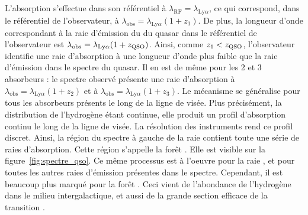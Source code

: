 L'absorption \lya{} s'effectue dans son référentiel à $\lambda_{\mathrm{RF}} = \lambda_{\mathrm{Ly}\alpha}$, ce qui correspond, dans le référentiel de l'observateur, à $\lambda_{\mathrm{obs}} = \lambda_{\mathrm{Ly}\alpha} (1+z_{1})$. De plus, la longueur d'onde correspondant à la raie d'émission du \lya{} du quasar dans le référentiel de l'observateur est $\lambda_{\mathrm{obs}} = \lambda_{\mathrm{Ly}\alpha} (1+z_{\textsc{QSO}})$. Ainsi, comme $z_1 < z_{\textsc{QSO}}$, l'observateur identifie une raie d'absorption à une longueur d'onde plus faible que la raie d'émission \lya{} dans le spectre du quasar. Il en est de même pour les 2 et 3 absorbeurs : le spectre observé présente une raie d'absorption à $\lambda_{\mathrm{obs}} = \lambda_{\mathrm{Ly}\alpha} (1+z_{2})$ et à $\lambda_{\mathrm{obs}} = \lambda_{\mathrm{Ly}\alpha} (1+z_{3})$.
Le mécanisme se généralise pour tous les absorbeurs présents le long de la ligne de visée.
Plus précisément, la distribution de l'hydrogène étant continue, elle produit un profil d'absorption continu le long de la ligne de visée. La résolution des instruments rend ce profil discret.
Ainsi, la région du spectre à gauche de la raie \lya{} contient toute une série de raies d'absorption. Cette région s'appelle la forêt \lya{}. Elle est visible sur la figure~\ref{fig:spectre_qso}. Ce même processus est à l'oeuvre pour la raie \lyb{}, et pour toutes les autres raies d'émission présentes dans le spectre.
Cependant, il est beaucoup plus marqué pour la forêt \lya{}. Ceci vient de l'abondance de l'hydrogène dans le milieu intergalactique, et aussi de la grande section efficace de la transition \lya{}.
